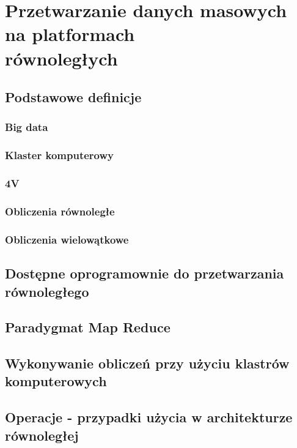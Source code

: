 \chapter{Przetwarzanie danych masowych na platformach\\równoległych} \label{chap.big-data-processing}

\section{Podstawowe definicje}
\subsection{Big data}
\subsection{Klaster komputerowy}
\subsection{4V}
\subsection{Obliczenia równoległe}
\subsection{Obliczenia wielowątkowe}
\section{Dostępne oprogramownie do przetwarzania równoległego}
\section{Paradygmat Map Reduce}
\section{Wykonywanie obliczeń przy użyciu klastrów komputerowych}
\section{Operacje - przypadki użycia w architekturze równoległej}
